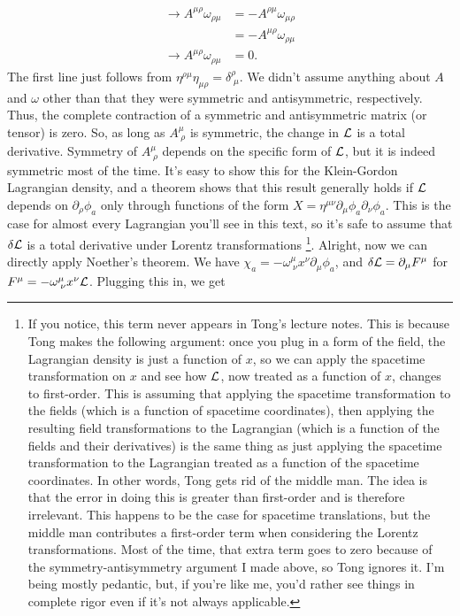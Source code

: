 \begin{align*}
    \rightarrow A^{\mu\rho}\omega_{\rho\mu} &= -A^{\rho\mu}\omega_{\mu\rho}\\
    & = -A^{\mu\rho}\omega_{\rho\mu}\\
    \rightarrow A^{\mu\rho}\omega_{\rho\mu}&=0.
\end{align*}
The first line just follows from $\eta^{\rho\mu}\eta_{\mu\rho}=\delta^\rho_{\;\mu}$. We didn't assume anything about $A$ and $\omega$ other than that they were symmetric and antisymmetric, respectively. Thus, the complete contraction of a symmetric and antisymmetric matrix (or tensor) is zero. So, as long as $A^\mu_{\;\rho}$ is symmetric, the change in $\mathcal{L}$ is a total derivative. Symmetry of $A^\mu_{\;\rho}$ depends on the specific form of $\mathcal{L}$, but it is indeed symmetric most of the time. It's easy to show this for the Klein-Gordon Lagrangian density, and a theorem shows that this result generally holds if $\mathcal{L}$ depends on $\partial_\rho\phi_a$ only through functions of the form $X=\eta^{\mu\nu}\partial_\mu\phi_a\partial_\nu\phi_a$. This is the case for almost every Lagrangian you'll see in this text, so it's safe to assume that $\delta\mathcal{L}$ is a total derivative under Lorentz transformations \footnote{If you notice, this term never appears in Tong's lecture notes. This is because Tong makes the following argument: once you plug in a form of the field, the Lagrangian density is just a function of $x$, so we can apply the spacetime transformation on $x$ and see how $\mathcal{L}$, now treated as a function of $x$, changes to first-order. This is assuming that applying the spacetime transformation to the fields (which is a function of spacetime coordinates), then applying the resulting field transformations to the Lagrangian (which is a function of the fields and their derivatives) is the same thing as just applying the spacetime transformation to the Lagrangian treated as a function of the spacetime coordinates. In other words, Tong gets rid of the middle man. The idea is that the error in doing this is greater than first-order and is therefore irrelevant. This happens to be the case for spacetime translations, but the middle man contributes a first-order term when considering the Lorentz transformations. Most of the time, that extra term goes to zero because of the symmetry-antisymmetry argument I made above, so Tong ignores it. I'm being mostly pedantic, but, if you're like me, you'd rather see things in complete rigor even if it's not always applicable.}. Alright, now we can directly apply Noether's theorem. We have $\chi_a= -\omega^\mu_{\;\nu}x^\nu\partial_\mu\phi_a$, and $\delta\mathcal{L}=\partial_\mu F^\mu$ for $F^\mu = -\omega^\mu_{\;\nu}x^\nu\mathcal{L}$. Plugging this in, we get 
